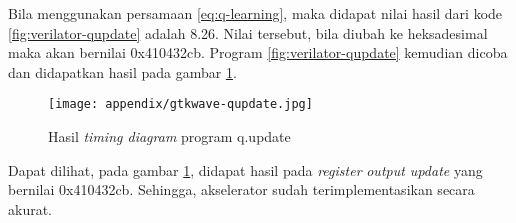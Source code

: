 Bila menggunakan persamaan \ref{eq:q-learning}, maka didapat nilai hasil dari kode \ref{fig:verilator-qupdate} adalah 8.26. Nilai tersebut, bila diubah ke heksadesimal maka akan bernilai 0x410432cb. Program \ref{fig:verilator-qupdate} kemudian dicoba dan didapatkan hasil pada gambar \ref{fig:gtkwave-qupdate}.

\begin{figure}[h]
	\centering
	\texttt{[image: appendix/gtkwave-qupdate.jpg]}
	\caption{Hasil \textit{timing diagram} program q.update}
	\label{fig:gtkwave-qupdate}
\end{figure}

Dapat dilihat, pada gambar \ref{fig:gtkwave-qupdate}, didapat hasil pada \textit{register} \textit{output update} yang bernilai 0x410432cb. Sehingga, akselerator sudah terimplementasikan secara akurat.
